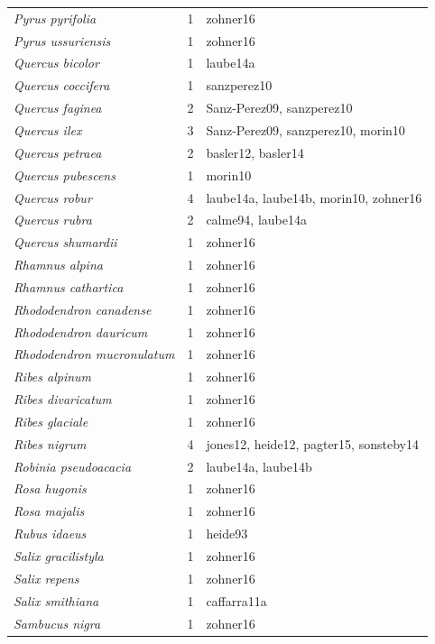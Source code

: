 \documentclass{article}
\begin{document}
\begin{footnotesize}
\begin{longtable}{p{}p{}p{}}
  \textit{Pyrus pyrifolia} &   1 & zohner16 \\ 
  \textit{Pyrus ussuriensis} &   1 & zohner16 \\ 
  \textit{Quercus bicolor} &   1 & laube14a \\ 
  \textit{Quercus coccifera} &   1 & sanzperez10 \\ 
  \textit{Quercus faginea} &   2 & Sanz-Perez09, sanzperez10 \\ 
  \textit{Quercus ilex} &   3 & Sanz-Perez09, sanzperez10, morin10 \\ 
  \textit{Quercus petraea} &   2 & basler12, basler14 \\ 
  \textit{Quercus pubescens} &   1 & morin10 \\ 
  \textit{Quercus robur} &   4 & laube14a, laube14b, morin10, zohner16 \\ 
  \textit{Quercus rubra} &   2 & calme94, laube14a \\ 
  \textit{Quercus shumardii} &   1 & zohner16 \\ 
  \textit{Rhamnus alpina} &   1 & zohner16 \\ 
  \textit{Rhamnus cathartica} &   1 & zohner16 \\ 
  \textit{Rhododendron canadense} &   1 & zohner16 \\ 
  \textit{Rhododendron dauricum} &   1 & zohner16 \\ 
  \textit{Rhododendron mucronulatum} &   1 & zohner16 \\ 
  \textit{Ribes alpinum} &   1 & zohner16 \\ 
  \textit{Ribes divaricatum} &   1 & zohner16 \\ 
  \textit{Ribes glaciale} &   1 & zohner16 \\ 
  \textit{Ribes nigrum} &   4 & jones12, heide12, pagter15, sonsteby14 \\ 
  \textit{Robinia pseudoacacia} &   2 & laube14a, laube14b \\ 
  \textit{Rosa hugonis} &   1 & zohner16 \\ 
  \textit{Rosa majalis} &   1 & zohner16 \\ 
  \textit{Rubus idaeus} &   1 & heide93 \\ 
  \textit{Salix gracilistyla} &   1 & zohner16 \\ 
  \textit{Salix repens} &   1 & zohner16 \\ 
  \textit{Salix smithiana} &   1 & caffarra11a \\ 
  \textit{Sambucus nigra} &   1 & zohner16 \\ 

\end{longtable}
\end{footnotesize}
\end{document}

